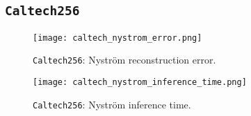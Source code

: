 \subsection{\texttt{Caltech256}      }
\begin{figure*}[h]
\begin{subfigure}[]{.49\textwidth}
\texttt{[image: caltech\_nystrom\_error.png]}
\caption{\texttt{Caltech256}: Nyström reconstruction error.}
\label{fig:caltech:nystrom_error}
\end{subfigure}
\begin{subfigure}[]{.49\textwidth}
\texttt{[image: caltech\_nystrom\_inference\_time.png]}
\caption{\texttt{Caltech256}: Nyström inference time.}
\label{fig:caltech:nystrom_time}
\end{subfigure}
\end{figure*}











